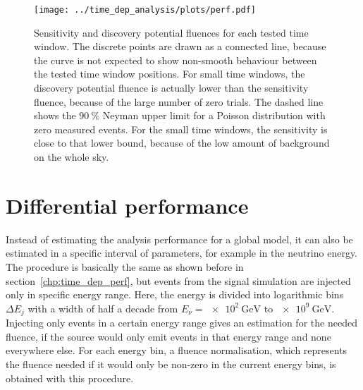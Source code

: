 \begin{figure}[htbp]
  \centering
  \texttt{[image: ../time\_dep\_analysis/plots/perf.pdf]}
  \caption[Performance fluences for each time window]{
    Sensitivity and discovery potential fluences for each tested time window.
    The discrete points are drawn as a connected line, because the curve is not expected to show non-smooth behaviour between the tested time window positions.
    For small time windows, the discovery potential fluence is actually lower than the sensitivity fluence, because of the large number of zero trials.
    The dashed line shows the $\SI{90}{\percent}$ Neyman upper limit for a Poisson distribution with zero measured events.
    For the small time windows, the sensitivity is close to that lower bound, because of the low amount of background on the whole sky.
  }
  \label{fig:tdep_perf}
\end{figure}


\section{Differential performance}
  \label{chp:time_dep_diff_perf}
Instead of estimating the analysis performance for a global model, it can also be estimated in a specific interval of parameters, for example in the neutrino energy.
The procedure is basically the same as shown before in section~\ref{chp:time_dep_perf}, but events from the signal simulation are injected only in specific energy range.
Here, the energy is divided into logarithmic bins $\Delta E_j$ with a width of half a decade from $E_\nu = \SI{e2}{\GeV}$ to $\SI{e9}{\GeV}$.
Injecting only events in a certain energy range gives an estimation for the needed fluence, if the source would only emit events in that energy range and none everywhere else.
For each energy bin, a fluence normalisation, which represents the fluence needed if it would only be non-zero in the current energy bins, is obtained with this procedure.

